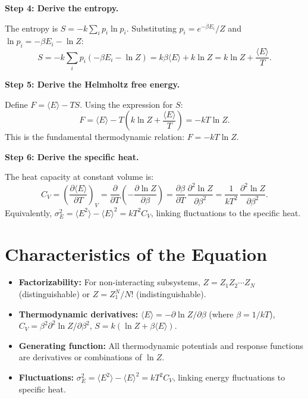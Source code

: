 \textbf{Step 4: Derive the entropy.}

The entropy is $S = -k\sum_i p_i \ln p_i$. Substituting $p_i = e^{-\beta E_i}/Z$ and $\ln p_i = -\beta E_i - \ln Z$:
\begin{equation}
S = -k\sum_i p_i(-\beta E_i - \ln Z) = k\beta\langle E\rangle + k\ln Z = k\ln Z + \frac{\langle E\rangle}{T}.
\end{equation}

\textbf{Step 5: Derive the Helmholtz free energy.}

Define $F = \langle E\rangle - TS$. Using the expression for $S$:
\begin{equation}
F = \langle E\rangle - T\!\left(k\ln Z + \frac{\langle E\rangle}{T}\right) = -kT\ln Z.
\end{equation}
This is the fundamental thermodynamic relation: $F = -kT\ln Z$.

\textbf{Step 6: Derive the specific heat.}

The heat capacity at constant volume is:
\begin{equation}
C_V = \left(\frac{\partial \langle E\rangle}{\partial T}\right)_V = \frac{\partial}{\partial T}\!\left(-\frac{\partial \ln Z}{\partial \beta}\right) = \frac{\partial \beta}{\partial T}\,\frac{\partial^{2}\ln Z}{\partial \beta^{2}} = \frac{1}{kT^{2}}\,\frac{\partial^{2}\ln Z}{\partial \beta^{2}}.
\end{equation}
Equivalently, $\sigma_E^{2} = \langle E^{2}\rangle - \langle E\rangle^{2} = kT^{2}C_V$, linking fluctuations to the specific heat.

\section*{Characteristics of the Equation}

\begin{itemize}
  \item \textbf{Factorizability:} For non-interacting subsystems, $Z = Z_{1}Z_{2}\cdots Z_{N}$ (distinguishable) or $Z = Z_{1}^{N}/N!$ (indistinguishable).
  \item \textbf{Thermodynamic derivatives:} $\langle E\rangle = -\partial\ln Z/\partial\beta$ (where $\beta = 1/kT$), $C_{V} = \beta^{2}\partial^{2}\ln Z/\partial\beta^{2}$, $S = k(\ln Z + \beta\langle E\rangle)$.
  \item \textbf{Generating function:} All thermodynamic potentials and response functions are derivatives or combinations of $\ln Z$.
  \item \textbf{Fluctuations:} $\sigma_{E}^{2} = \langle E^{2}\rangle - \langle E\rangle^{2} = kT^{2}C_{V}$, linking energy fluctuations to specific heat.
\end{itemize}
